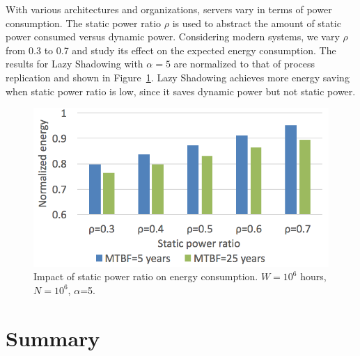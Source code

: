 With various architectures and organizations, servers
vary in terms of
power consumption. The static power ratio $\rho$ is used to abstract the
amount of static power consumed versus dynamic power. 
Considering modern systems, we vary $\rho$ from 0.3 to 0.7 and study its effect
on the expected energy consumption. The results for Lazy Shadowing with $\alpha=5$ are normalized to that of process replication and shown in 
Figure~\ref{fig:power_ratio}. 
Lazy Shadowing achieves
more energy saving when static power ratio is low, since it saves dynamic 
power but not static power. %

\begin{figure}[!t]
	\captionsetup{justification=centering}
	\begin{center}
		\includegraphics[width=0.7\columnwidth]{figures/ts_power_5}
	\end{center}
	\caption{Impact of static power ratio on energy consumption. $W=10^6$ hours, $N=10^6$, $\alpha$=5.}
	\label{fig:power_ratio}
\end{figure}

\section{Summary}


